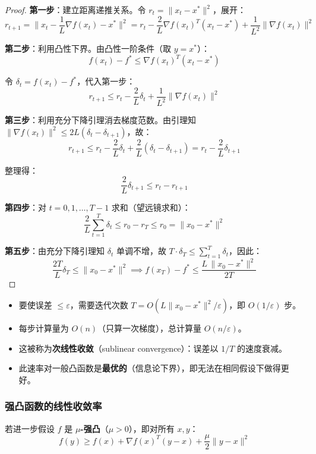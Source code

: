 \documentclass[10pt]{article}
\numberwithin{equation}{section}
\theoremstyle{plain}
\theoremstyle{definition}
\theoremstyle{remark}
\newcommand{\norm}[1]{\lVert #1 \rVert}
\begin{document}
\begin{proof}
	\textbf{第一步}：建立距离递推关系。令 $r_t = \norm{x_t - x^*}^2$，展开：
	\[r_{t+1} = \norm{x_t - \frac{1}{L}\nabla f(x_t) - x^*}^2 = r_t - \frac{2}{L}\nabla f(x_t)^T(x_t - x^*) + \frac{1}{L^2}\norm{\nabla f(x_t)}^2\]

	\textbf{第二步}：利用凸性下界。由凸性一阶条件（取 $y = x^*$）：
	\[f(x_t) - f^* \leq \nabla f(x_t)^T(x_t - x^*)\]

	令 $\delta_t = f(x_t) - f^*$，代入第一步：
	\[r_{t+1} \leq r_t - \frac{2}{L}\delta_t + \frac{1}{L^2}\norm{\nabla f(x_t)}^2\]

	\textbf{第三步}：利用充分下降引理消去梯度范数。由引理知 $\norm{\nabla f(x_t)}^2 \leq 2L(\delta_t - \delta_{t+1})$，故：
	\[r_{t+1} \leq r_t - \frac{2}{L}\delta_t + \frac{2}{L}(\delta_t - \delta_{t+1})
		= r_t - \frac{2}{L}\delta_{t+1}\]

	整理得：
	\[\frac{2}{L}\delta_{t+1} \leq r_t - r_{t+1}\]

	\textbf{第四步}：对 $t = 0, 1, \ldots, T-1$ 求和（望远镜求和）：
	\[\frac{2}{L}\sum_{t=1}^{T}\delta_t \leq r_0 - r_T \leq r_0 = \norm{x_0 - x^*}^2\]

	\textbf{第五步}：由充分下降引理知 $\delta_t$ 单调不增，故 $T \cdot \delta_T \leq \sum_{t=1}^T \delta_t$，因此：
	\[\frac{2T}{L}\delta_T \leq \norm{x_0 - x^*}^2
		\implies f(x_T) - f^* \leq \frac{L\,\norm{x_0 - x^*}^2}{2T}\]
\end{proof}

\begin{RemarkBox}[$O(1/T)$ 收敛率的含义]
	\begin{itemize}
		\item 要使误差 $\leq \varepsilon$，需要迭代次数 $T = O(L \norm{x_0 - x^*}^2 / \varepsilon)$，即 $O(1/\varepsilon)$ 步。
		\item 每步计算量为 $O(n)$（只算一次梯度），总计算量 $O(n/\varepsilon)$。
		\item 这被称为\textbf{次线性收敛}（sublinear convergence）：误差以 $1/T$ 的速度衰减。
		\item 此速率对一般凸函数是\textbf{最优的}（信息论下界），即无法在相同假设下做得更好。
	\end{itemize}
\end{RemarkBox}

\subsubsection{强凸函数的线性收敛率}

若进一步假设 $f$ 是 \textbf{$\mu$-强凸}（$\mu > 0$），即对所有 $x, y$：
\[f(y) \geq f(x) + \nabla f(x)^T(y-x) + \frac{\mu}{2}\norm{y-x}^2\]
\end{document}
